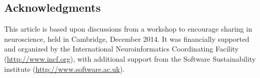 \documentclass[11pt]{article}
\begin{document}
\subsection*{Acknowledgments}

This article is based upon discussions from a workshop to encourage
sharing in neuroscience, held in Cambridge, December 2014.  It was
financially supported and organized by the International
Neuroinformatics Coordinating Facility (\url{http://www.incf.org}),
with additional support from the Software Sustainability institute
(\url{http://www.software.ac.uk}).


\printbibliography
\end{document}
